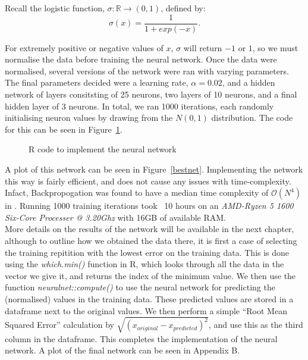 Recall the logistic function, $\sigma : \mathbb{R} \to (0,1)$, defined by:
\[
    \sigma(x) = \frac{1}{1+exp(-x)}.
\]

For extremely positive or negative values of $x$, $\sigma$ will return $-1$ or $1$, so we must normalise the data before training the neural 
network. Once the data were normalised, several versions of the network were ran with varying parameters. The final parameters decided were a learning rate, $\alpha = 0.02$, and a hidden network of layers consitsting of 
25 neurons, two layers of 10 neurons, and a final hidden layer of 3 neurons. In total, we ran 1000 iterations, each randomly initialising neuron values by drawing from the $N(0,1)$ distribution. 
The code for this can be seen in Figure~\ref{nnRcode}.

\begin{figure}[h] %
    
    \caption{R code to implement the neural network}
    \label{nnRcode}
\end{figure}

A plot of this network can be seen in Figure~\ref{bestnet}. Implementing the network this way is fairly efficient, and does not cause any issues with time-complexity. Infact, Backpropogation 
was found to have a median time complexity of $\mathcal{O}(N^4)$ in \cite{lister}. Running 1000 training iterations took ~10 hours on an \textit{AMD-Ryzen 5 1600 Six-Core Processer @ 3.20Ghz} with 16GB of available RAM. \\

More details on the results of the network will be available in the next chapter, although to outline how we obtained the data there, it is first a case of selecting the training repitition 
with the lowest error on the training data. This is done using the \textit{which.min()} function in R, which looks through all the data in the vector we give it, and returns the index of the minimum value.
We then use the function \textit{neuralnet::compute()} to use the neural network for predicting the (normalised) values in the training data. These predicted values are stored in a dataframe next to the original values. 
We then perform a simple ``Root Mean Squared Error'' calculation by $\sqrt{(x_{original}-x_{predicted})^2}$, and use this as the third column in the dataframe. This completes the implementation of the neural network.
A plot of the final network can be seen in Appendix B. 

